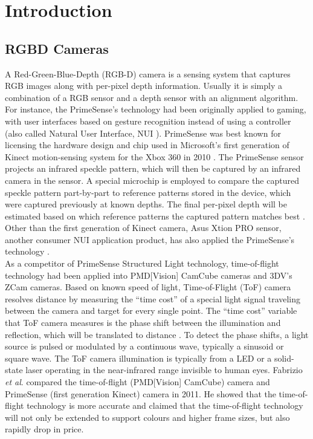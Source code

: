 \chapter{Introduction} %
\label{chapterIntroduction} 
\section{RGBD Cameras}
\indent
A Red-Green-Blue-Depth (RGB-D) camera is a sensing system that captures RGB images along with per-pixel depth information. Usually it is simply a combination of a RGB sensor and a depth sensor with an alignment algorithm. For instance, the PrimeSense's technology had been originally applied to gaming, with user interfaces based on gesture recognition instead of using a controller (also called Natural User Interface, NUI \cite{BraveNUIworld_2011}). PrimeSense was best known for licensing the hardware design and chip used in Microsoft's first generation of Kinect motion-sensing system for the Xbox 360 in 2010 \cite{PrimeSenseInfo_2013}. The PrimeSense sensor projects an infrared speckle pattern, which will then be captured by an infrared camera in the sensor. A special microchip is employed to compare the captured speckle pattern part-by-part to reference patterns stored in the device, which were captured previously at known depths. The final per-pixel depth will be estimated based on which reference patterns the captured pattern matches best \cite{Krystof12}. Other than the first generation of Kinect camera, Asus Xtion PRO sensor, another consumer NUI application product, has also applied the PrimeSense's technology \cite{AsusXtion_2013}.
\\\indent%
As a competitor \cite{evaluationBetween_2015} of PrimeSense Structured Light technology, time-of-flight technology had been applied into PMD[Vision] CamCube cameras and 3DV's ZCam cameras. Based on known speed of light, Time-of-Flight (ToF) camera resolves distance by measuring the \enquote{time cost} of a special light signal traveling between the camera and target for every single point. The \enquote{time cost} variable that ToF camera measures is the phase shift between the illumination and reflection, which will be translated to distance \cite{TimeOfFlight}. To detect the phase shifts, a light source is pulsed or modulated by a continuous wave, typically a sinusoid or square wave. The ToF camera illumination is typically from a LED or a solid-state laser operating in the near-infrared range invisible to human eyes. Fabrizio \textit{et al}. \cite{depthTechCompare_2011} compared the time-of-flight (PMD[Vision] CamCube) camera and PrimeSense (first generation Kinect) camera in 2011. He showed that the time-of-flight technology is more accurate and claimed that the time-of-flight technology will not only be extended to support colours and higher frame sizes, but also rapidly drop in price. %
